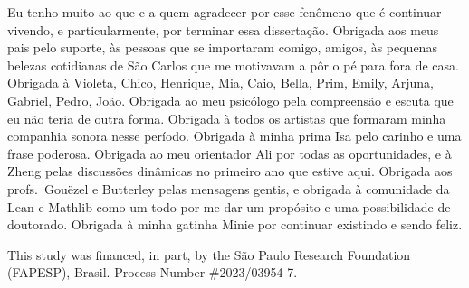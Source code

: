 Eu tenho muito ao que e a quem agradecer por esse fenômeno que é continuar vivendo, e particularmente, por terminar essa dissertação. Obrigada aos meus pais pelo suporte, às pessoas que se importaram comigo, amigos, às pequenas belezas cotidianas de São Carlos que me motivavam a pôr o pé para fora de casa. Obrigada à Violeta, Chico, Henrique, Mia, Caio, Bella, Prim, Emily, Arjuna, Gabriel, Pedro, João. Obrigada ao meu psicólogo pela compreensão e escuta que eu não teria de outra forma. Obrigada à todos os artistas que formaram minha companhia sonora nesse período. Obrigada à minha prima Isa pelo carinho e uma frase poderosa. Obrigada ao meu orientador Ali por todas as oportunidades, e à Zheng pelas discussões dinâmicas no primeiro ano que estive aqui. Obrigada aos profs.\ Gouëzel e Butterley pelas mensagens gentis, e obrigada à comunidade da Lean e Mathlib como um todo por me dar um propósito e uma possibilidade de doutorado. Obrigada à minha gatinha Minie por continuar existindo e sendo feliz.

This study was financed, in part, by the São Paulo Research Foundation (FAPESP), Brasil. Process Number \#2023/03954-7.
